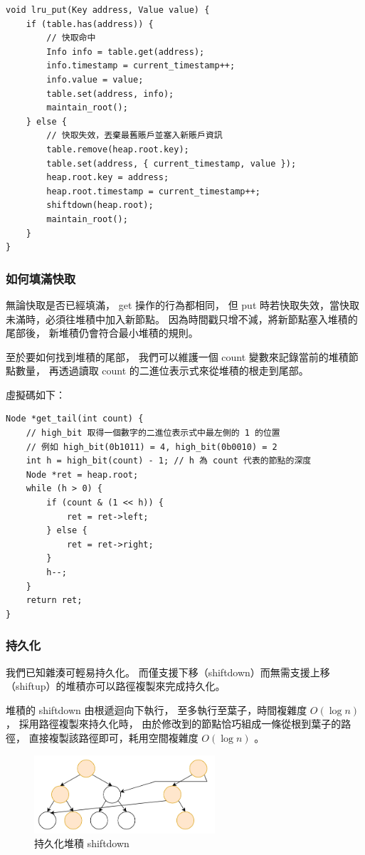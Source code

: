 \begin{lstlisting}
void lru_put(Key address, Value value) {
    if (table.has(address)) {
        // 快取命中
        Info info = table.get(address);
        info.timestamp = current_timestamp++;
        info.value = value;
        table.set(address, info);
        maintain_root();
    } else {
        // 快取失效，丟棄最舊賬戶並塞入新賬戶資訊
        table.remove(heap.root.key);
        table.set(address, { current_timestamp, value });
        heap.root.key = address;
        heap.root.timestamp = current_timestamp++;
        shiftdown(heap.root);
        maintain_root();
    }
}
\end{lstlisting}

\subsubsection{如何填滿快取}
無論快取是否已經填滿， get 操作的行為都相同，
但 put 時若快取失效，當快取未滿時，必須往堆積中加入新節點。
因為時間戳只增不減，將新節點塞入堆積的尾部後，
新堆積仍會符合最小堆積的規則。

至於要如何找到堆積的尾部，
我們可以維護一個 count 變數來記錄當前的堆積節點數量，
再透過讀取 count 的二進位表示式來從堆積的根走到尾部。

虛擬碼如下：

\begin{lstlisting}
Node *get_tail(int count) {
    // high_bit 取得一個數字的二進位表示式中最左側的 1 的位置
    // 例如 high_bit(0b1011) = 4, high_bit(0b0010) = 2
    int h = high_bit(count) - 1; // h 為 count 代表的節點的深度
    Node *ret = heap.root;
    while (h > 0) {
        if (count & (1 << h)) {
            ret = ret->left;
        } else {
            ret = ret->right;
        }
        h--;
    }
    return ret;
}
\end{lstlisting}

\subsubsection{持久化}

我們已知雜湊可輕易持久化。
而僅支援下移（shiftdown）而無需支援上移（shiftup）的堆積亦可以路徑複製來完成持久化。

堆積的 shiftdown 由根遞迴向下執行，
至多執行至葉子，時間複雜度 $O(\log n)$ ，
採用路徑複製來持久化時，
由於修改到的節點恰巧組成一條從根到葉子的路徑，
直接複製該路徑即可，耗用空間複雜度 $O(\log n)$ 。

\begin{figure}[ht]
\centerline{\includegraphics[width=0.6\textwidth]{持久化堆積下移}}
\caption{持久化堆積 shiftdown}
\end{figure}

